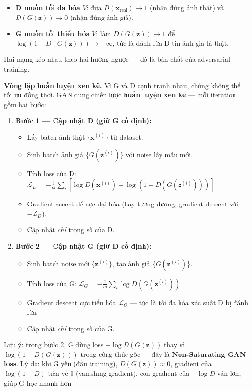\begin{itemize}
	\item \textbf{D muốn tối đa hóa} $V$: đưa $D(\mathbf{x}_\text{real}) \to 1$ (nhận đúng ảnh thật) và $D(G(\mathbf{z})) \to 0$ (nhận đúng ảnh giả).
	\item \textbf{G muốn tối thiểu hóa} $V$: làm $D(G(\mathbf{z})) \to 1$ để $\log(1 - D(G(\mathbf{z}))) \to -\infty$, tức là đánh lừa D tin ảnh giả là thật.
\end{itemize}

Hai mạng kéo nhau theo hai hướng ngược --- đó là bản chất của adversarial training.

\textbf{Vòng lặp huấn luyện xen kẽ.}
Vì G và D cạnh tranh nhau, chúng không thể tối ưu đồng thời. GAN dùng chiến lược \textbf{huấn luyện xen kẽ} --- mỗi iteration gồm hai bước:

\begin{enumerate}
	\item \textbf{Bước 1 --- Cập nhật D (giữ G cố định):}
	\begin{itemize}
		\item Lấy batch ảnh thật $\{\mathbf{x}^{(i)}\}$ từ dataset.
		\item Sinh batch ảnh giả $\{G(\mathbf{z}^{(i)})\}$ với noise lấy mẫu mới.
		\item Tính loss của D: $\mathcal{L}_D = -\frac{1}{m}\sum_i \left[\log D(\mathbf{x}^{(i)}) + \log(1 - D(G(\mathbf{z}^{(i)})))\right]$
		\item Gradient ascent để cực đại hóa (hay tương đương, gradient descent với $-\mathcal{L}_D$).
		\item Cập nhật \textit{chỉ} trọng số của D.
	\end{itemize}

	\item \textbf{Bước 2 --- Cập nhật G (giữ D cố định):}
	\begin{itemize}
		\item Sinh batch noise mới $\{\mathbf{z}^{(i)}\}$, tạo ảnh giả $\{G(\mathbf{z}^{(i)})\}$.
		\item Tính loss của G: $\mathcal{L}_G = -\frac{1}{m}\sum_i \log D(G(\mathbf{z}^{(i)}))$
		\item Gradient descent cực tiểu hóa $\mathcal{L}_G$ --- tức là tối đa hóa xác suất D bị đánh lừa.
		\item Cập nhật \textit{chỉ} trọng số của G.
	\end{itemize}
\end{enumerate}

Lưu ý: trong bước 2, G dùng loss $-\log D(G(\mathbf{z}))$ thay vì $\log(1-D(G(\mathbf{z})))$ trong công thức gốc --- đây là \textbf{Non-Saturating GAN loss}. Lý do: khi G yếu (đầu training), $D(G(\mathbf{z})) \approx 0$, gradient của $\log(1-D)$ tiến về 0 (vanishing gradient), còn gradient của $-\log D$ vẫn lớn, giúp G học nhanh hơn.

